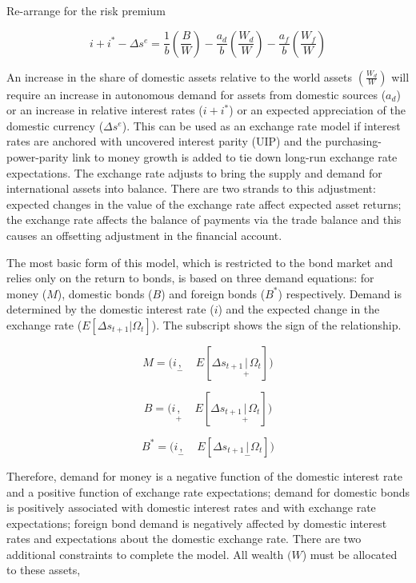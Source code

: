 \documentclass[12pt, a4paper, oneside]{article}\usepackage[]{graphicx}\usepackage[]{color}
\begin{document}
Re-arrange for the risk premium

\begin{equation}
i+i^*-\Delta s^e=\frac{1}{b}\left(\frac{B}{W}\right)-\frac{a_d}{b}\left(\frac{W_d}{W}\right)-\frac{a_f}{b}\left(\frac{W_f}{W}\right)
\end{equation}

An increase in the share of domestic assets relative to the world assets $\left(\frac{W_d}{W}\right)$ will require an increase in autonomous demand for assets from domestic sources ($a_d$) or an increase in relative interest rates ($i+i^*$) or an expected appreciation of the domestic currency ($\Delta s^e$).  This can be used as an exchange rate model if interest rates are anchored with uncovered interest parity (UIP) and the purchasing-power-parity link to money growth is added to tie down long-run exchange rate expectations.    The exchange rate adjusts to bring the supply and demand for international assets into balance.  There are two strands to this adjustment: expected changes in the value of the exchange rate affect expected asset returns; the exchange rate affects the balance of payments via the trade balance and this causes an offsetting adjustment in the financial account. 

The most basic form of this model, which is restricted to the bond market and relies only on the return to bonds, is based on three demand equations: for money ($M$), domestic bonds ($B$) and foreign bonds ($B^*$) respectively.  Demand is determined by the domestic interest rate ($i$) and the expected change in the exchange rate ($E[\Delta s_{t+1}|\Omega_t]$). The subscript shows the sign of the relationship.  

\begin{equation}
M=\big ( i \underset{-}, \quad E[\Delta s_{t+1}\underset{+}|\Omega_t ] \big)
\end{equation}

\begin{equation}
B=\big ( i \underset{+}, \quad E[\Delta s_{t+1}\underset{+}|\Omega_t ] \big)
\end{equation}

\begin{equation}
B^*=\big ( i \underset{-}, \quad E[\Delta s_{t+1}\underset{-}|\Omega_t ] \big)
\end{equation}

Therefore, demand for money is a negative function of the domestic interest rate and a positive function of exchange rate expectations; demand for domestic bonds is positively associated with domestic interest rates and with exchange rate expectations; foreign bond demand is negatively affected by domestic interest rates and expectations about the domestic exchange rate.  There are two additional constraints to complete the model.  All wealth $(W$) must be allocated to these assets, 
\end{document}
